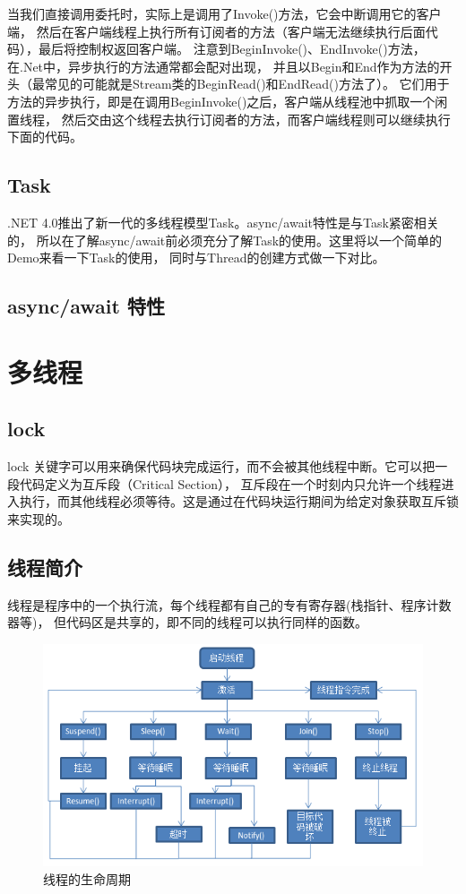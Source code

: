 \documentclass{book}
\begin{document}
当我们直接调用委托时，实际上是调用了Invoke()方法，它会中断调用它的客户端，
然后在客户端线程上执行所有订阅者的方法（客户端无法继续执行后面代码），最后将控制权返回客户端。
注意到BeginInvoke()、EndInvoke()方法，在.Net中，异步执行的方法通常都会配对出现，
并且以Begin和End作为方法的开头（最常见的可能就是Stream类的BeginRead()和EndRead()方法了）。
它们用于方法的异步执行，即是在调用BeginInvoke()之后，客户端从线程池中抓取一个闲置线程，
然后交由这个线程去执行订阅者的方法，而客户端线程则可以继续执行下面的代码。

\subsection{Task}

.NET 4.0推出了新一代的多线程模型Task。async/await特性是与Task紧密相关的，
所以在了解async/await前必须充分了解Task的使用。这里将以一个简单的Demo来看一下Task的使用，
同时与Thread的创建方式做一下对比。

\subsection{async/await 特性}

\section{多线程}

\subsection{lock}

lock 关键字可以用来确保代码块完成运行，而不会被其他线程中断。它可以把一段代码定义为互斥段（Critical Section），
互斥段在一个时刻内只允许一个线程进入执行，而其他线程必须等待。这是通过在代码块运行期间为给定对象获取互斥锁来实现的。

\subsection{线程简介}

线程是程序中的一个执行流，每个线程都有自己的专有寄存器(栈指针、程序计数器等)，
但代码区是共享的，即不同的线程可以执行同样的函数。

\begin{figure}[htbp]
	\centering
	\includegraphics[scale=0.8]{ThreadLifeCircle.png}
	\caption{线程的生命周期}
	\label{fig:ThreadLifeCircle}
\end{figure}
\end{document}
